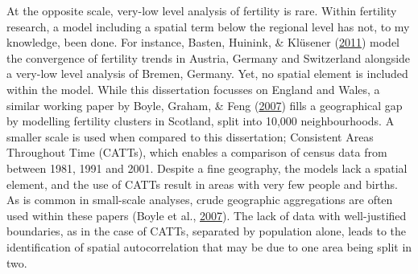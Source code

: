 \documentclass[12pt,twoside]{reedthesis}
\begin{document}
At the opposite scale, very-low level analysis of fertility is rare. Within fertility research, a model including a spatial term below the regional level has not, to my knowledge, been done. For instance, Basten, Huinink, \& Klüsener (\protect\hyperlink{ref-basten2011}{2011}) model the convergence of fertility trends in Austria, Germany and Switzerland alongside a very-low level analysis of Bremen, Germany. Yet, no spatial element is included within the model. While this dissertation focusses on England and Wales, a similar working paper by Boyle, Graham, \& Feng (\protect\hyperlink{ref-boyle2007}{2007}) fills a geographical gap by modelling fertility clusters in Scotland, split into 10,000 neighbourhoods. A smaller scale is used when compared to this dissertation; Consistent Areas Throughout Time (CATTs), which enables a comparison of census data from between 1981, 1991 and 2001. Despite a fine geography, the models lack a spatial element, and the use of CATTs result in areas with very few people and births. As is common in small-scale analyses, crude geographic aggregations are often used within these papers (Boyle et al., \protect\hyperlink{ref-boyle2007}{2007}). The lack of data with well-justified boundaries, as in the case of CATTs, separated by population alone, leads to the identification of spatial autocorrelation that may be due to one area being split in two.
\end{document}
